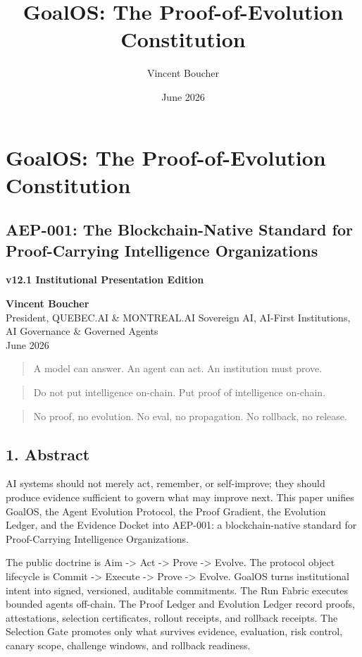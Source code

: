 \documentclass[
]{article}
\title{GoalOS: The Proof-of-Evolution Constitution}
\author{Vincent Boucher}
\date{June 2026}
\begin{document}
\maketitle

\section{GoalOS: The Proof-of-Evolution
Constitution}\label{goalos-the-proof-of-evolution-constitution}

\subsection{AEP-001: The Blockchain-Native Standard for Proof-Carrying
Intelligence
Organizations}\label{aep-001-the-blockchain-native-standard-for-proof-carrying-intelligence-organizations}

\textbf{v12.1 Institutional Presentation Edition}

\textbf{Vincent Boucher}\\
President, QUEBEC.AI \& MONTREAL.AI \textbar{} Sovereign AI, AI-First
Institutions, AI Governance \& Governed Agents\\
June 2026

\begin{quote}
A model can answer. An agent can act. An institution must prove.
\end{quote}

\begin{quote}
Do not put intelligence on-chain. Put proof of intelligence on-chain.
\end{quote}

\begin{quote}
No proof, no evolution. No eval, no propagation. No rollback, no
release.
\end{quote}

\subsection{1. Abstract}\label{abstract}

AI systems should not merely act, remember, or self-improve; they should
produce evidence sufficient to govern what may improve next. This paper
unifies GoalOS, the Agent Evolution Protocol, the Proof Gradient, the
Evolution Ledger, and the Evidence Docket into AEP-001: a
blockchain-native standard for Proof-Carrying Intelligence
Organizations.

The public doctrine is Aim -\textgreater{} Act -\textgreater{} Prove
-\textgreater{} Evolve. The protocol object lifecycle is Commit
-\textgreater{} Execute -\textgreater{} Prove -\textgreater{} Evolve.
GoalOS turns institutional intent into signed, versioned, auditable
commitments. The Run Fabric executes bounded agents off-chain. The Proof
Ledger and Evolution Ledger record proofs, attestations, selection
certificates, rollout receipts, and rollback receipts. The Selection
Gate promotes only what survives evidence, evaluation, risk control,
canary scope, challenge windows, and rollback readiness.
\end{document}
